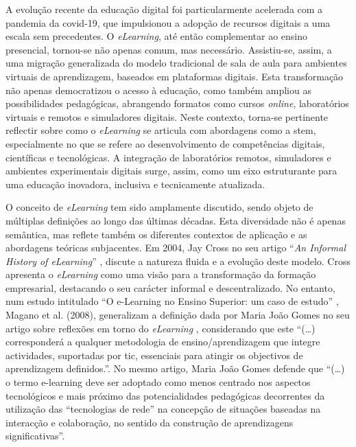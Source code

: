 A evolução recente da educação digital foi particularmente acelerada com a pandemia da \acrshort{covid-19}, que impulsionou a adopção de recursos digitais a uma escala sem precedentes. O \textit{eLearning}, até então complementar ao ensino presencial, tornou-se não apenas comum, mas necessário. Assistiu-se, assim, a uma migração generalizada do modelo tradicional de sala de aula para ambientes virtuais de aprendizagem, baseados em plataformas digitais. Esta transformação não apenas democratizou o acesso à educação, como também ampliou as possibilidades pedagógicas, abrangendo formatos como cursos \textit{online}, laboratórios virtuais e remotos e simuladores digitais. Neste contexto, torna-se pertinente reflectir sobre como o \textit{eLearning} se articula com abordagens como a \acrshort{stem}, especialmente no que se refere ao desenvolvimento de competências digitais, científicas e tecnológicas. A integração de laboratórios remotos, simuladores e ambientes experimentais digitais surge, assim, como um eixo estruturante para uma educação inovadora, inclusiva e tecnicamente atualizada.

O conceito de \textit{eLearning} tem sido amplamente discutido, sendo objeto de múltiplas definições ao longo das últimas décadas. Esta diversidade não é apenas semântica, mas reflete também os diferentes contextos de aplicação e as abordagens teóricas subjacentes. Em 2004, Jay Cross no seu artigo ``\textit{An Informal History of eLearning}'' \cite{jaycross}, discute a natureza fluida e a evolução deste modelo. Cross apresenta o \textit{eLearning} como uma visão para a transformação da formação empresarial, destacando o seu carácter informal e descentralizado.  No entanto, num estudo intitulado ``O e-Learning no Ensino Superior: um caso de estudo'' \cite{eLearningenssup}, Magano et al. (2008), generalizam a definição dada por Maria João Gomes no seu artigo sobre reflexões em torno do \textit{eLearning} \cite{gomes_e-learning_2005}, considerando que este ``(\ldots) corresponderá a qualquer metodologia de ensino/aprendizagem que integre actividades, suportadas por \acrshort{tic}, essenciais para atingir os objectivos de aprendizagem definidos.''. No mesmo artigo, Maria João Gomes defende que ``(\ldots) o termo e-learning deve ser adoptado como menos centrado nos aspectos tecnológicos e mais próximo das potencialidades pedagógicas decorrentes da utilização das ``tecnologias de rede'' na concepção de situações baseadas na interacção e colaboração, no sentido da construção de aprendizagens significativas''.

